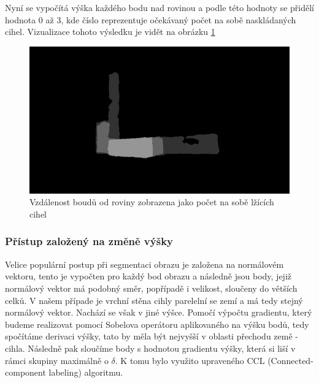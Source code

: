\documentclass[twoside]{ctuthesis}
\begin{document}
Nyní se vypočítá výška každého bodu nad rovinou a podle této hodnoty se přidělí hodnota 0 až 3, kde číslo reprezentuje očekávaný počet na sobě naskládaných cihel. Vizualizace tohoto výsledku je vidět na obrázku \ref{fig:height_map}

\begin{figure}
    \centering
    \includegraphics[width = \linewidth]{pictures/original_vrstva2_pic1.jpg}
    \caption{Vzdálenost boudů od roviny zobrazena jako počet na sobě lžících cihel}
    \label{fig:height_map}
\end{figure}

\subsubsection{Přístup založený na změně výšky}
Velice populární postup při segmentaci obrazu je založena na normálovém vektoru, tento je vypočten pro každý bod obrazu a následně jsou body, jejiž normálový vektor má podobný směr, popřípadě i velikost, sloučeny do větších celků. V našem případe je vrchní stěna cihly parelelní se zemí a má tedy stejný normálový vektor. Nachází se však v jiné výšce. Pomočí výpočtu gradientu, který budeme realizovat pomocí Sobelova operátoru aplikovaného na výšku bodů, tedy spočítáme derivaci výšky, tato by měla být nejvyšší v oblasti přechodu země - cihla. Následně pak sloučíme body s hodnotou gradientu výšky, která si liší v rámci skupiny maximálně o $\delta$. K tomu bylo využito upraveného CCL (Connected-component labeling) algoritmu. 
\end{document}

